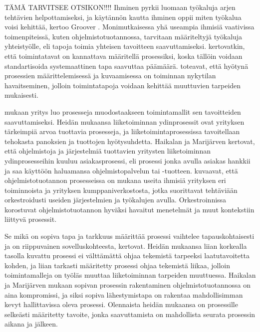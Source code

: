 \documentclass[finnish,12pt,a4paper,pdftex]{article}
\begin{document}
TÄMÄ TARVITSEE OTSIKON!!!!
Ihminen pyrkii luomaan työkaluja arjen tehtävien helpottamiseksi, ja käytännön kautta ihminen oppii miten työkalua voisi kehittää, kertoo Groover \citeyearpar{groover}. Monimutkaisessa yhä useampia ihmisiä vaativissa toimenpiteissä, kuten ohjelmistotuotannossa, tarvitaan määriteltyjä työkaluja yhteistyölle, eli tapoja toimia yhteisen tavoitteen saavuttamiseksi. \citeauthor{leanit} \citeyearpar{leanit} kertovatkin, että toimintatavat on kannattava määritellä prosessiksi, koska tällöin voidaan standartisoida systemaattinen tapa saavuttaa päämäärä. \citeauthor{leanit} toteavat, että hyötynä prosessien määrittelemisessä ja kuvaamisessa on toiminnan nykytilan havaitseminen, jolloin toimintatapoja voidaan kehittää muuttuvien tarpeiden mukaisesti.

\cite{teollisuustalous} mukaan yritys luo prosesseja muodostaakseen toimintamallit sen tavoitteiden saavuttamiseksi. Heidän mukaansa liiketoiminnan ydinprosessit ovat yrityksen tärkeimpiä arvoa tuottavia prosesseja, ja liiketoimintaprosessissa tavoitellaan tehokasta panoksien ja tuottojen hyötysuhdetta. Haikalan ja Marijärven \citeyearpar{ohjelmistotuotanto} kertovat, että ohjelmistoja ja järjestelmiä tuottavien yritysten liiketoiminnan ydinprosesseihin kuuluu asiakasprosessi, eli prosessi jonka avulla asiakas hankkii ja saa käyttöön haluamansa ohjelmistopalvelun tai -tuotteen. \cite{okaytannot} kuvaavat, että ohjelmistotuotannon prosesseissa on mukana useita ihmisiä yrityksen eri toiminnoista ja yrityksen kumppaniverkostosta, jotka suorittavat tehtäviään orkestroidusti useiden järjestelmien ja työkalujen avulla. Orkestroinnissa korostuvat ohjelmistotuotannon hyväksi havaitut menetelmät ja muut kontekstiin liittyvä prosessit.
 
Se mikä on sopiva tapa ja tarkkuus määrittää prosessi vaihtelee tapauskohtaisesti ja on riippuvainen sovelluskohteesta, \cite{ohjelmistotuotanto} kertovat. Heidän mukaansa liian korkealla tasolla kuvattu prosessi ei välttämättä ohjaa tekemistä tarpeeksi laatutavoitetta kohden, ja liian tarkasti määritetty prosessi ohjaa tekemistä liikaa, jolloin toimintamalleja on työläs muuttaa liiketoiminnan tarpeiden muuttuessa. Haikalan ja Marijärven mukaan sopivan prosessin rakentaminen ohjelmistotuotannossa on aina kompromissi, ja siksi sopiva lähestymistapa on rakentaa mahdollisimman kevyt hallittavissa oleva prosessi. Olennaista heidän mukaansa on prosessille selkeästi määritetty tavoite, jonka saavuttamista on mahdollista seurata prosessin aikana ja jälkeen. 
\end{document}
